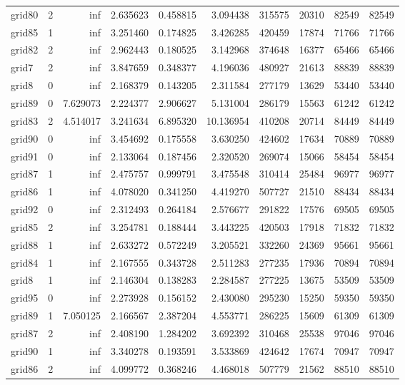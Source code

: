 \documentclass[../../../thesis.tex]{subfiles}
\begin{document}
\begin{longtable}{|l|r|r|r|r|r|r|r|r|r|}
grid80 & 2 & inf & 2.635623 & 0.458815 & 3.094438 & 315575 & 20310 & 82549 & 82549 \\
grid85 & 1 & inf & 3.251460 & 0.174825 & 3.426285 & 420459 & 17874 & 71766 & 71766 \\
grid82 & 2 & inf & 2.962443 & 0.180525 & 3.142968 & 374648 & 16377 & 65466 & 65466 \\
grid7 & 2 & inf & 3.847659 & 0.348377 & 4.196036 & 480927 & 21613 & 88839 & 88839 \\
grid8 & 0 & inf & 2.168379 & 0.143205 & 2.311584 & 277179 & 13629 & 53440 & 53440 \\
grid89 & 0 & 7.629073 & 2.224377 & 2.906627 & 5.131004 & 286179 & 15563 & 61242 & 61242 \\
grid83 & 2 & 4.514017 & 3.241634 & 6.895320 & 10.136954 & 410208 & 20714 & 84449 & 84449 \\
grid90 & 0 & inf & 3.454692 & 0.175558 & 3.630250 & 424602 & 17634 & 70889 & 70889 \\
grid91 & 0 & inf & 2.133064 & 0.187456 & 2.320520 & 269074 & 15066 & 58454 & 58454 \\
grid87 & 1 & inf & 2.475757 & 0.999791 & 3.475548 & 310414 & 25484 & 96977 & 96977 \\
grid86 & 1 & inf & 4.078020 & 0.341250 & 4.419270 & 507727 & 21510 & 88434 & 88434 \\
grid92 & 0 & inf & 2.312493 & 0.264184 & 2.576677 & 291822 & 17576 & 69505 & 69505 \\
grid85 & 2 & inf & 3.254781 & 0.188444 & 3.443225 & 420503 & 17918 & 71832 & 71832 \\
grid88 & 1 & inf & 2.633272 & 0.572249 & 3.205521 & 332260 & 24369 & 95661 & 95661 \\
grid84 & 1 & inf & 2.167555 & 0.343728 & 2.511283 & 277235 & 17936 & 70894 & 70894 \\
grid8 & 1 & inf & 2.146304 & 0.138283 & 2.284587 & 277225 & 13675 & 53509 & 53509 \\
grid95 & 0 & inf & 2.273928 & 0.156152 & 2.430080 & 295230 & 15250 & 59350 & 59350 \\
grid89 & 1 & 7.050125 & 2.166567 & 2.387204 & 4.553771 & 286225 & 15609 & 61309 & 61309 \\
grid87 & 2 & inf & 2.408190 & 1.284202 & 3.692392 & 310468 & 25538 & 97046 & 97046 \\
grid90 & 1 & inf & 3.340278 & 0.193591 & 3.533869 & 424642 & 17674 & 70947 & 70947 \\
grid86 & 2 & inf & 4.099772 & 0.368246 & 4.468018 & 507779 & 21562 & 88510 & 88510 \\

\end{longtable}
\end{document}
